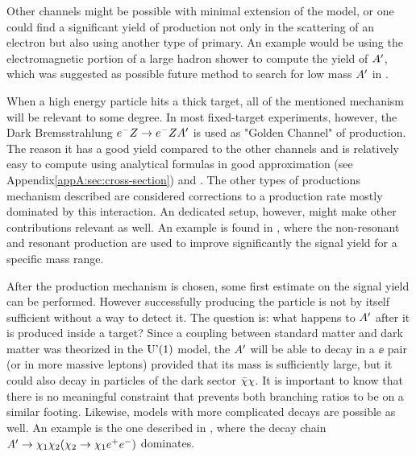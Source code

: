 Other channels might be possible with minimal extension of the model, or one could find a significant yield of production not only in the scattering of an electron but also using another type of primary. An example would be using the electromagnetic portion of a large hadron shower to compute the yield of $A'$, which was suggested as possible future method to search for low mass $A'$ in \cite{Celentano:2020vtu}.

When a high energy particle hits a thick target, all of the mentioned mechanism will be relevant to some degree. %
In most fixed-target experiments, however, the Dark Bremsstrahlung $e^- Z \to e^- Z A'$ is used as "Golden Channel" of production. The reason it has a good yield compared to the other channels and is relatively easy to compute using analytical formulas in good approximation (see Appendix\ref{appA:sec:cross-section}) and . The other types of productions mechanism described are considered corrections to a production rate mostly dominated by this interaction. An dedicated setup, however, might make other contributions relevant as well. An example is found in \cite{Marsicano_2018}, where the non-resonant and resonant production are used to improve significantly the signal yield for a specific mass range.

After the production mechanism is chosen, some first estimate on the signal yield can be performed. However successfully producing the particle is not by itself sufficient without a way to detect it. The question is: what happens to $A'$ after it is produced inside a target? Since a coupling between standard matter and dark matter was theorized in the $\textrm{U'(1)}$ model, the $A'$ will be able to decay in a $\ee$ pair (or in more massive leptons) provided that its mass is sufficiently large, but it could also decay in particles of the dark sector $\bar{\chi} \chi$. It is important to know that there is no meaningful constraint that prevents both branching ratios to be on a similar footing. Likewise, models with more complicated decays are possible as well. An example is the one described in \cite{Mohlabeng_2019}, where the decay chain $A' \to \chi_1 \chi_2(\chi_2 \to \chi_1 e^+e^-)$ dominates. 

